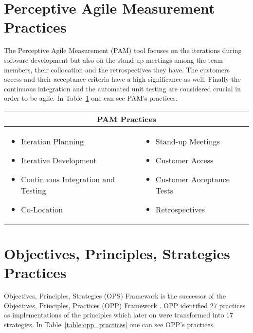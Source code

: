 \section[PAM Practices]{Perceptive Agile Measurement Practices}
The Perceptive Agile Measurement (PAM) tool focuses on the iterations during software development but also on the stand-up meetings among the team members, their collocation and the retrospectives they have. The customers access and their acceptance criteria have a high significance as well. Finally the continuous integration and the automated unit testing are considered crucial in order to be agile. In Table~\ref{table:pam_practices} one can see PAM's practices.

\begin{table} [H]
  \begin{tabular}{| p{6cm} p{6cm} |}
    \hline
    \multicolumn{2}{|c|}{\textbf{PAM Practices}}  \\ \hline
    	\begin{itemize} \item Iteration Planning \item Iterative Development \item Continuous Integration and Testing \item Co-Location \end{itemize} &
     \begin{itemize} \item Stand-up Meetings \item Customer Access \item Customer Acceptance Tests \item Retrospectives \end{itemize}  \\ \hline
  \end{tabular}
  \label{table:pam_practices}
\end{table}

\section{Objectives, Principles, Strategies Practices}
Objectives, Principles, Strategies (OPS) Framework is the successor of the Objectives, Principles, Practices (OPP) Framework \cite{opp}. OPP identified 27 practices as implementations of the principles which later on were transformed into 17 strategies. In Table~\ref{table:opp_practices} one can see OPP's practices. 

